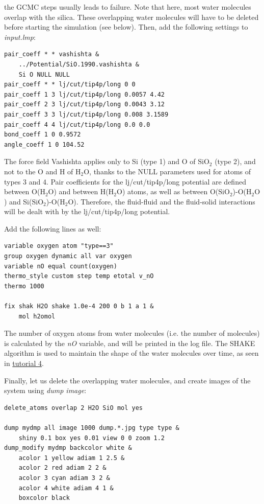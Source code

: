 \documentclass[9pt,tutorial]{livecoms}
\begin{document}
the GCMC steps usually leads to failure. Note that here, most water molecules
overlap with the silica. These overlapping water molecules will have to be
deleted before starting the simulation (see below). Then, add the following
settings to \textit{input.lmp}:
{\normalsize \begin{verbatim}
pair_coeff * * vashishta &
    ../Potential/SiO.1990.vashishta &
    Si O NULL NULL
pair_coeff * * lj/cut/tip4p/long 0 0
pair_coeff 1 3 lj/cut/tip4p/long 0.0057 4.42
pair_coeff 2 3 lj/cut/tip4p/long 0.0043 3.12
pair_coeff 3 3 lj/cut/tip4p/long 0.008 3.1589
pair_coeff 4 4 lj/cut/tip4p/long 0.0 0.0
bond_coeff 1 0 0.9572
angle_coeff 1 0 104.52
\end{verbatim}}
The force field Vashishta applies only to Si (type 1) and O of $\text{SiO}_2$ (type 2),
and not to the O and H of $\text{H}_2\text{O}$, thanks to the NULL parameters
used for atoms of types 3 and 4. Pair coefficients for the lj/cut/tip4p/long
potential are defined between O($\text{H}_2\text{O}$) and between H($\text{H}_2\text{O}$)
atoms, as well as between O($\text{SiO}_2$)-O($\text{H}_2\text{O}$) and
Si($\text{SiO}_2$)-O($\text{H}_2\text{O}$). Therefore, the fluid-fluid and the
fluid-solid interactions will be dealt with by the lj/cut/tip4p/long potential.

Add the following lines as well:
{\normalsize \begin{verbatim}
variable oxygen atom "type==3"
group oxygen dynamic all var oxygen
variable nO equal count(oxygen)
thermo_style custom step temp etotal v_nO
thermo 1000

fix shak H2O shake 1.0e-4 200 0 b 1 a 1 &
    mol h2omol
\end{verbatim}}
The number of oxygen atoms from water molecules (i.e. the number of molecules)
is calculated by the \textit{nO} variable, and will be printed in the log file.
The SHAKE algorithm is used to maintain the shape of the water molecules over time,
as seen in \hyperref[sheared-confined-label]{tutorial 4}.

Finally, let us delete the overlapping water molecules, and create images
of the system using \textit{dump image}:
{\normalsize \begin{verbatim}
delete_atoms overlap 2 H2O SiO mol yes

dump mydmp all image 1000 dump.*.jpg type type &
    shiny 0.1 box yes 0.01 view 0 0 zoom 1.2
dump_modify mydmp backcolor white &
    acolor 1 yellow adiam 1 2.5 &
    acolor 2 red adiam 2 2 &
    acolor 3 cyan adiam 3 2 &
    acolor 4 white adiam 4 1 &
    boxcolor black
\end{verbatim}}
\end{document}
